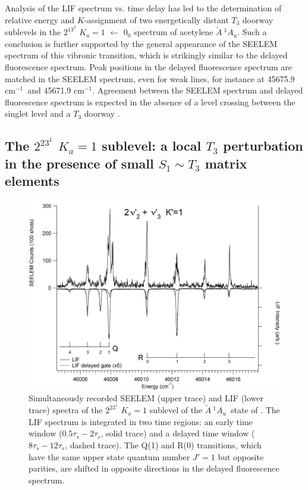\documentclass[12pt]{mitthesis}
\newcommand{\rcm}{cm$^{-1}$}
\newcommand{\astate}{$
  \tilde{A} \: ^1\!A_u
  $}
\newcommand{\Ka}[1]{$K_a\!\!=\!#1$}
\begin{document}
Analysis of the LIF spectrum vs. time delay has led to the
determination of relative energy and $K$-assignment of two
energetically distant $T_3$ doorway sublevels in the $2^13^2$ \Ka{1}
$\leftarrow$ $0_0$ spectrum of acetylene \astate.  Such a conclusion
is further supported by the general appearance of the SEELEM spectrum
of this vibronic transition, which is strikingly similar to the
delayed fluorescence spectrum.  Peak positions in the delayed
fluorescence spectrum are matched in the SEELEM spectrum, even for
weak lines, for instance at 45675.9 \rcm\ and 45671.9 \rcm.  Agreement
between the SEELEM spectrum and delayed fluorescence spectrum is
expected in the absence of a level crossing between the singlet level
and a $T_3$ doorway \cite{altunata01}.


\subsection{The $2^23^1$ \Ka{1} sublevel: a local $T_3$
  perturbation in the presence of small $S_1 \sim T_3$ matrix
  elements}



\begin{figure}
  \caption{Simultaneously recorded SEELEM (upper trace) and LIF (lower
    trace) spectra of the $2^23^1$ \Ka{1} sublevel of the \astate\
    state of .  The LIF spectrum is integrated in two time
    regions: an early time window ($0.5\tau_s-2\tau_s$, solid trace)
    and a delayed time window ($8\tau_s-12\tau_s$, dashed trace).  The
    Q(1) and R(0) transitions, which have the same upper state quantum
    number $J'=1$ but opposite parities, are shifted in opposite
    directions in the delayed fluorescence spectrum.}
  \label{fig:spectrum-2231}
  \centering
  \vspace{1cm}
  \includegraphics[width=7in,angle=90]{acetylene-2231-q4r3.png}
\end{figure}
\end{document}
